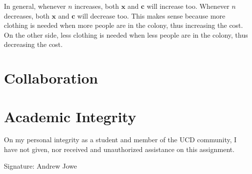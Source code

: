 \documentclass[17pt]{extarticle}
\begin{document}
In general, whenever $n$ increases, both $\textbf{x}$ and $\textbf{c}$ will increase too. Whenever $n$ decreases, both $\textbf{x}$ and $\textbf{c}$ will decrease too. This makes sense because more clothing is needed when more people are in the colony, thus increasing the cost. On the other side, less clothing is needed when less people are in the colony, thus decreasing the cost.

\newpage
\section*{Collaboration}

\newpage
\section*{Academic Integrity}
On my personal integrity as a student and member of the UCD community, I have not given, nor received and unauthorized assistance on this assignment.

Signature: Andrew Jowe
\end{document}

